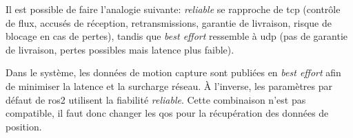 Il est possible de faire l’analogie suivante: \textit{reliable} se rapproche de \gls{tcp} (contrôle de flux, accusés de réception, retransmissions, garantie de livraison, risque de blocage en cas de pertes), tandis que \textit{best effort} ressemble à \gls{udp} (pas de garantie de livraison, pertes possibles mais latence plus faible).

Dans le système, les données de motion capture sont publiées en \textit{best effort} afin de minimiser la latence et la surcharge réseau. À l’inverse, les paramètres par défaut de \gls{ros2} utilisent la fiabilité \textit{reliable}. Cette combinaison n’est pas compatible, il faut donc changer les \gls{qos} pour la récupération des données de position. 






